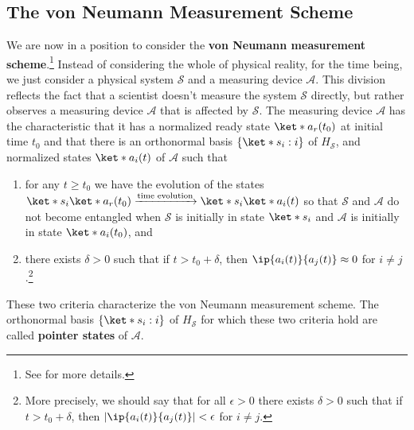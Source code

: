 \documentclass[12pt]{report}
\begin{document}
    
    \subsection{The von Neumann Measurement Scheme}\label{vonNeumannMeasurement}
    \addtocounter{footnote}{-1}
    \addtocounter{footnote}{1}
    
    We are now in a position to consider the \textbf{von Neumann measurement scheme}.\footnote{See \cite[50-53]{Schlosshauer} for more details.} Instead of considering the whole of physical reality, for the time being, we just consider a physical system $\mathcal{S}$ and a measuring device $\mathcal{A}$.  %
%
    This division reflects the fact that a scientist doesn't measure the system $\mathcal{S}$ directly, but rather observes a measuring device $\mathcal{A}$ that is affected by $\mathcal{S}$. The measuring device $\mathcal{A}$ has the characteristic that it has a normalized ready state $\ket*{a_r(t_0)}$   %
%
    at initial time $t_0$ and that there is an orthonormal basis $\{\ket*{s_i}:i\}$ of $H_\mathcal{S}$, and normalized states $\ket*{a_i(t)}$ of $\mathcal{A}$ such that
    \begin{enumerate}[noitemsep, nosep, topsep=0pt] 
    \item for any $t\geq t_0$ we have the evolution of the states \label{vonNeumannMeasurement1}
    $\ket*{s_i}\ket*{a_r(t_0)}\xrightarrow{\text{time evolution}}\ket*{s_i}\ket*{a_i(t)}$ so that $\mathcal{S}$ and $\mathcal{A}$ do not become entangled when $\mathcal{S}$ is initially in state $\ket*{s_i}$ and $\mathcal{A}$ is initially in state $\ket*{a_i(t_0)}$, and
    \item \label{vonNeumannMeasurement2} there exists $\delta>0$ such that if $t> t_0+\delta$, then $\ip{a_i(t)}{a_j(t)}\approx 0$ %
     for $i\neq j$.\footnote{\label{approx}More precisely, we should say that for all $\epsilon >0$ there exists $\delta>0$ such that if $t> t_0+\delta$, then $|\ip{a_i(t)}{a_j(t)}|<\epsilon$ for $i\neq j$.}
    \end{enumerate}
    These two criteria    %
%
    characterize the von Neumann measurement scheme. The orthonormal basis $\{\ket*{s_i}:i\}$ of $H_\mathcal{S}$ for which these two criteria hold are called \textbf{pointer states\label{pointer}} of $\mathcal{A}$.   %
\end{document}
